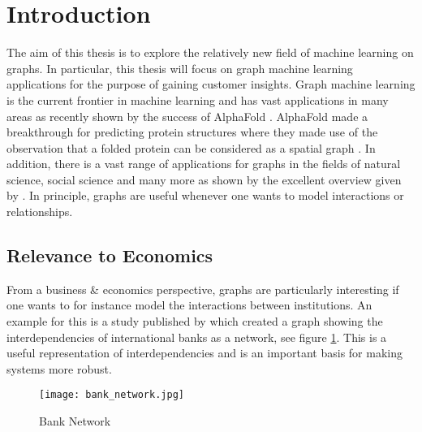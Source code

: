 	
	\section{Introduction}

	The aim of this thesis is to explore the relatively new field of machine
	learning on graphs. In particular, this thesis will focus on graph machine
	learning applications for the purpose of gaining customer insights. Graph
	machine learning is the current frontier in machine learning and has vast
	applications in many areas as recently shown by the success of AlphaFold
	\citep{senior2020improved}. AlphaFold made a breakthrough for predicting
	protein structures where they made use of the observation that a folded
	protein can be considered as a spatial graph \citep{AlphaFoldTeam2020}. In
	addition, there is a vast range of applications for graphs in the fields of 
	natural science, social science and many more as shown by the excellent 
	overview given by \cite{zhou2020graph}. In principle, graphs are useful 
	whenever one wants to model interactions or relationships.\\

	\subsection{Relevance to Economics}

	\noindent From a business \& economics perspective, graphs are particularly
	interesting if one wants to for instance model the interactions between
	institutions. An example for this is a study published by
	\cite{schweitzer2009economic} which created a graph showing the 
	interdependencies of international banks as a network, see figure 
	\ref{fig:bank_network}. This is a useful representation of interdependencies 
	and is an important basis for making systems more robust. \\

	\begin{figure}[h]
		\centering
		\texttt{[image: bank\_network.jpg]}
		\caption{Bank Network}
		\cite[p. 424]{schweitzer2009economic}
		\label{fig:bank_network}
	\end{figure}

